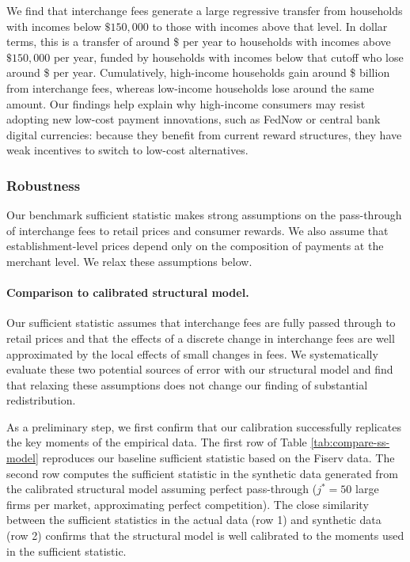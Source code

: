 \documentclass[main.tex]{subfiles}
\begin{document}
We find that interchange fees generate a large regressive transfer from households with incomes below $\$150,000$ to those with incomes above that level.
In dollar terms, this is a transfer of around \$ per year to households with incomes above $\$150,000$ per year, funded by households with incomes below that cutoff who lose around \$ per year.
Cumulatively, high-income households gain around \$ billion from interchange fees, whereas low-income households lose around the same amount.
Our findings help explain why high-income consumers may resist adopting new low-cost payment innovations, such as FedNow or central bank digital currencies: because they benefit from current reward structures, they have weak incentives to switch to low-cost alternatives.

\subsubsection{Robustness}
\label{subsubsec:robustness}

Our benchmark sufficient statistic makes strong assumptions on the pass-through of interchange fees to retail prices and consumer rewards. We also assume that establishment-level prices depend only on the composition of payments at the merchant level. We relax these assumptions below.

\paragraph{Comparison to calibrated structural model.}
Our sufficient statistic assumes that interchange fees are fully passed through to retail prices and that the effects of a discrete change in interchange fees are well approximated by the local effects of small changes in fees.
We systematically evaluate these two potential sources of error with our structural model and find that relaxing these assumptions does not change our finding of substantial redistribution.

As a preliminary step, we first confirm that our calibration successfully replicates the key moments of the empirical data. The first row of Table \ref{tab:compare-ss-model} reproduces our baseline sufficient statistic based on the Fiserv data.
The second row computes the sufficient statistic in the synthetic data generated from the calibrated structural model assuming perfect pass-through ($j^*=50$ large firms per market, approximating perfect competition).
The close similarity between the sufficient statistics in the actual data (row 1) and synthetic data (row 2) confirms that the structural model is well calibrated to the moments used in the sufficient statistic.
\end{document}
